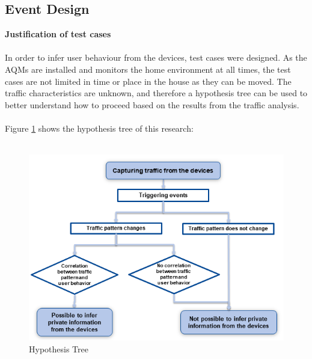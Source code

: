 \subsection{Event Design}
\textbf{Justification of test cases}\\\\
In order to infer user behaviour from the devices, test cases were designed. As the AQMs are installed and monitors the home environment at all times, the test cases are not limited in time or place in the house as they can be moved. The traffic characteristics are unknown, and therefore a hypothesis tree can be used to better understand how to proceed based on the results from the traffic analysis. 
\\\\
Figure \ref{fig:HypothesisTree} shows the hypothesis tree of this research:
\\\\
\begin{figure} [H]
    \includegraphics[width=1\textwidth]{figures/Hypothesistree.png}
    \caption{Hypothesis Tree}
    \label{fig:HypothesisTree}
\end{figure}

